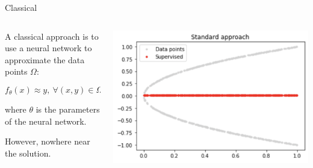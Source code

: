 \documentclass[aspectratio=1610,xcolor={dvipsnames},hyperref={colorlinks,unicode,linkcolor=violet,anchorcolor=BlueViolet,citecolor=YellowOrange,filecolor=black,urlcolor=Aquamarine}]{beamer}
\begin{document}
\begin{frame}[label={sec:orgdd90e17}]{Classical}
\begin{columns}
\begin{column}{0.4\columnwidth}
A classical approach is to use a neural network to approximate the data points \(\Omega\):

\[f_{\theta}(x) \approx y,\ \forall (x, y) \in \Omega\]

where \(\theta\) is the parameters of the neural network.

However, nowhere near the solution.
\end{column}

\begin{column}{0.6\columnwidth}
\begin{center}
\includegraphics[width=.9\linewidth]{./p2.png}
\end{center}
\end{column}
\end{columns}
\end{frame}
\end{document}
